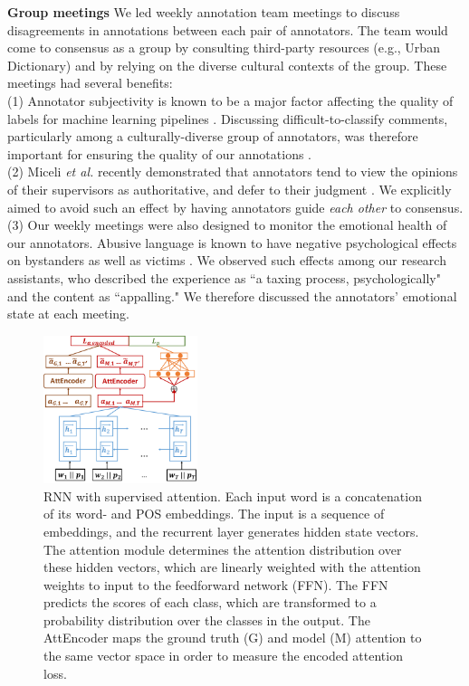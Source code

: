 \documentclass[letterpaper]{article} %
\begin{document}
\noindent\textbf{Group meetings}
We led weekly annotation team meetings to discuss disagreements in annotations between each pair of annotators.
The team would come to consensus as a group by consulting third-party resources (e.g., Urban Dictionary) and by relying on the diverse cultural contexts of the group.
These meetings had several benefits: \\
(1) Annotator subjectivity is known to be a major factor affecting the quality of labels for machine learning pipelines \cite{hube2019understanding}.
Discussing difficult-to-classify comments, particularly among a culturally-diverse group of annotators, was therefore important for ensuring the quality of our annotations \cite{vidgen2019challenges}. \\
\noindent (2) Miceli \textit{et al.} recently demonstrated that annotators tend to view the opinions of their supervisors as authoritative, and defer to their judgment  \cite{miceli2020between}.
We explicitly aimed to avoid such an effect by having annotators guide \textit{each other} to consensus. \\
(3) Our weekly meetings were also designed to monitor the emotional health of our annotators.
Abusive language is known  to have negative psychological effects on bystanders as well as victims \cite{low2007experiences,ferguson2011know}.
We observed such effects among our research assistants, who described the experience as ``a taxing process, psychologically" and the content as ``appalling."
We therefore discussed the annotators' emotional state at each meeting.

\begin{figure}[h!]
\captionsetup{font=normalsize}
\centering
\includegraphics[width=0.4\textwidth]{model.pdf}
\caption{RNN with supervised attention. Each input word is a concatenation of its word- and POS embeddings. The input is a sequence of embeddings, and the recurrent layer generates hidden state vectors. The attention module determines the attention distribution over these hidden vectors, which are linearly weighted with the attention weights to  input to the feedforward network (FFN). The FFN  predicts the scores of each class, which are transformed to a probability distribution over the classes in the output. The AttEncoder maps the ground truth (G) and model (M) attention to the same vector space in order to measure the encoded attention loss.}
\label{rnn_supervised_attetnion}
\end{figure}
\end{document}
